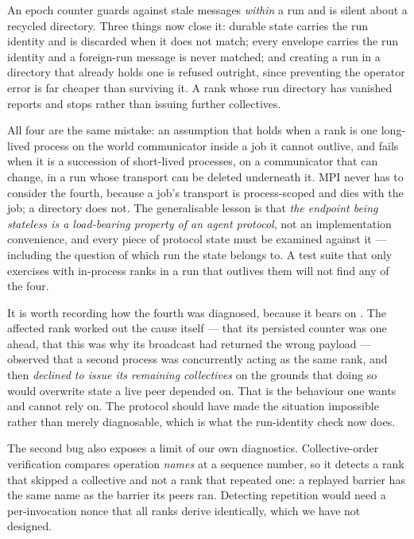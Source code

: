 An epoch counter guards against stale messages \emph{within} a run and is
silent about a recycled directory. Three things now close it: durable state
carries the run identity and is discarded when it does not match; every
envelope carries the run identity and a foreign-run message is never
matched; and creating a run in a directory that already holds one is refused
outright, since preventing the operator error is far cheaper than surviving
it. A rank whose run directory has vanished reports  and
stops rather than issuing further collectives.

All four are the same mistake: an assumption that holds when a rank is one
long-lived process on the world communicator inside a job it cannot outlive,
and fails when it is a succession of short-lived processes, on a communicator
that can change, in a run whose transport can be deleted underneath it. MPI
never has to consider the fourth, because a job's transport is process-scoped
and dies with the job; a directory does not. The generalisable lesson is that
\emph{the endpoint being stateless is a load-bearing property of an agent
protocol}, not an implementation convenience, and every piece of protocol
state must be examined against it --- including the question of which run the
state belongs to. A test suite that only exercises  with
in-process ranks in a run that outlives them will not find any of the four.

It is worth recording how the fourth was diagnosed, because it bears on
. The affected rank worked out the cause
itself --- that its persisted counter was one ahead, that this was why its
broadcast had returned the wrong payload --- observed that a second process
was concurrently acting as the same rank, and then \emph{declined to issue
its remaining collectives} on the grounds that doing so would overwrite state
a live peer depended on. That is the behaviour one wants and cannot rely on.
The protocol should have made the situation impossible rather than merely
diagnosable, which is what the run-identity check now does.

The second bug also exposes a limit of our own diagnostics. Collective-order
verification compares operation \emph{names} at a sequence number, so it
detects a rank that skipped a collective and not a rank that repeated one:
a replayed barrier has the same name as the barrier its peers ran. Detecting
repetition would need a per-invocation nonce that all ranks derive
identically, which we have not designed.


